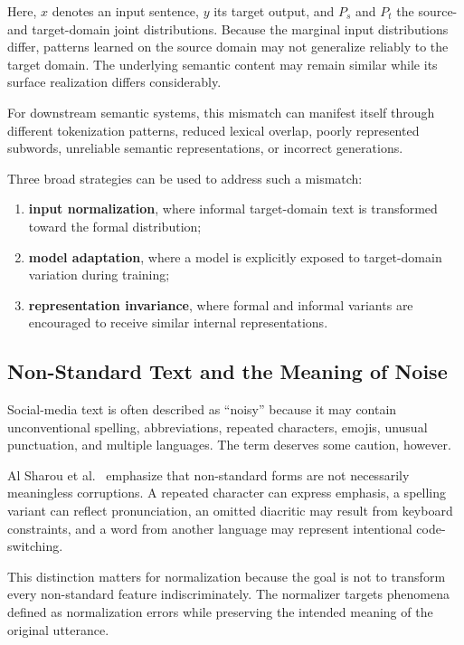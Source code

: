 \documentclass[12pt, a4paper, twoside, openany]{report}
\begin{document}
Here, $x$ denotes an input sentence, $y$ its target output, and $P_s$ and $P_t$ the source- and target-domain joint distributions. Because the marginal input distributions differ, patterns learned on the source domain may not generalize reliably to the target domain. The underlying semantic content may remain similar while its surface realization differs considerably.

For downstream semantic systems, this mismatch can manifest itself through different tokenization patterns, reduced lexical overlap, poorly represented subwords, unreliable semantic representations, or incorrect generations.

Three broad strategies can be used to address such a mismatch:

\begin{enumerate}
	\item \textbf{input normalization}, where informal target-domain text is transformed toward the formal distribution;

	\item \textbf{model adaptation}, where a model is explicitly exposed to target-domain variation during training;

	\item \textbf{representation invariance}, where formal and informal variants are encouraged to receive similar internal representations.
\end{enumerate}



\subsection{Non-Standard Text and the Meaning of Noise}

Social-media text is often described as ``noisy'' because it may contain unconventional spelling, abbreviations, repeated characters, emojis, unusual punctuation, and multiple languages. The term deserves some caution, however.

Al Sharou et al.~\cite{alsharou2021noise} emphasize that non-standard forms are not necessarily meaningless corruptions. A repeated character can express emphasis, a spelling variant can reflect pronunciation, an omitted diacritic may result from keyboard constraints, and a word from another language may represent intentional code-switching.

This distinction matters for normalization because the goal is not to transform every non-standard feature indiscriminately. The normalizer targets phenomena defined as normalization errors while preserving the intended meaning of the original utterance.
\end{document}
